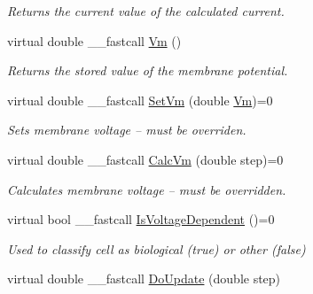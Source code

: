 \begin{DoxyCompactItemize}
\begin{DoxyCompactList}\small\item\em Returns the current value of the calculated current. \end{DoxyCompactList}\item 
\hypertarget{class_t_cell_afd81f2fd923ffbfa5ea7eda2c50693d1}{virtual double \+\_\+\+\_\+fastcall \hyperlink{class_t_cell_afd81f2fd923ffbfa5ea7eda2c50693d1}{Vm} ()}\label{class_t_cell_afd81f2fd923ffbfa5ea7eda2c50693d1}

\begin{DoxyCompactList}\small\item\em Returns the stored value of the membrane potential. \end{DoxyCompactList}\item 
\hypertarget{class_t_cell_a8b7f6098ca372dac0b4b45c361bcaa64}{virtual double \+\_\+\+\_\+fastcall \hyperlink{class_t_cell_a8b7f6098ca372dac0b4b45c361bcaa64}{Set\+Vm} (double \hyperlink{class_t_cell_afd81f2fd923ffbfa5ea7eda2c50693d1}{Vm})=0}\label{class_t_cell_a8b7f6098ca372dac0b4b45c361bcaa64}

\begin{DoxyCompactList}\small\item\em Sets membrane voltage -- must be overriden. \end{DoxyCompactList}\item 
\hypertarget{class_t_cell_a052db3a15a6d2c93b475fc71198c46c7}{virtual double \+\_\+\+\_\+fastcall \hyperlink{class_t_cell_a052db3a15a6d2c93b475fc71198c46c7}{Calc\+Vm} (double step)=0}\label{class_t_cell_a052db3a15a6d2c93b475fc71198c46c7}

\begin{DoxyCompactList}\small\item\em Calculates membrane voltage -- must be overridden. \end{DoxyCompactList}\item 
\hypertarget{class_t_cell_abbdbd5f05d4ae7ec2a311444416072de}{virtual bool \+\_\+\+\_\+fastcall \hyperlink{class_t_cell_abbdbd5f05d4ae7ec2a311444416072de}{Is\+Voltage\+Dependent} ()=0}\label{class_t_cell_abbdbd5f05d4ae7ec2a311444416072de}

\begin{DoxyCompactList}\small\item\em Used to classify cell as biological (true) or other (false) \end{DoxyCompactList}\item 
\hypertarget{class_t_cell_a676e15babd5f58f19577a362f01400a3}{virtual double \+\_\+\+\_\+fastcall \hyperlink{class_t_cell_a676e15babd5f58f19577a362f01400a3}{Do\+Update} (double step)}\label{class_t_cell_a676e15babd5f58f19577a362f01400a3}


\end{DoxyCompactItemize}
